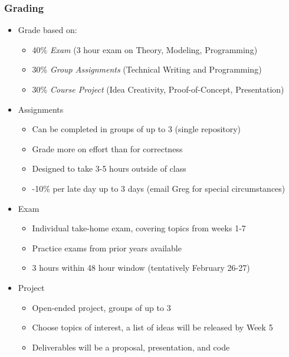 \documentclass[handout]{beamer}
\begin{document}
\begin{frame}
	\frametitle{Grading}
	\pause
	\begin{itemize}[<+->]
		\item Grade based on:
		\begin{itemize}
			\item 40\% {\em Exam} (3 hour exam on Theory, Modeling, Programming)
			\item 30\% {\em Group Assignments} (Technical Writing and Programming)
			\item 30\% {\em Course Project} (Idea Creativity, Proof-of-Concept, Presentation)
		\end{itemize}
	
		\item Assignments
		\begin{itemize}
			\item Can be completed in groups of up to 3 (single repository)
			\item Grade more on effort than for correctness
			\item Designed to take 3-5 hours outside of class
			\item -10\% per late day up to 3 days (email Greg for special circumstances)
		\end{itemize}

		\item Exam
		\begin{itemize}
		\item Individual take-home exam, covering topics from weeks 1-7
		\item Practice exams from prior years available
		\item 3 hours within 48 hour window (tentatively February 26-27)
		\end{itemize}
	
		\item Project
		\begin{itemize}
			\item Open-ended project, groups of up to 3 
			\item Choose topics of interest, a list of ideas will be released by Week 5
			\item Deliverables will be a proposal, presentation, and code
		\end{itemize}
	\end{itemize}
\end{frame}
\end{document}

